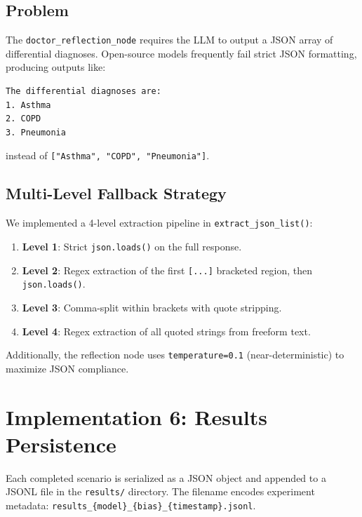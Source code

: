 \documentclass[12pt, a4paper]{article}
\begin{document}
\subsection{Problem}

The \texttt{doctor\_reflection\_node} requires the LLM to output a JSON array
of differential diagnoses. Open-source models frequently fail strict JSON
formatting, producing outputs like:

\begin{verbatim}
The differential diagnoses are:
1. Asthma
2. COPD
3. Pneumonia
\end{verbatim}

instead of \texttt{["Asthma", "COPD", "Pneumonia"]}.

\subsection{Multi-Level Fallback Strategy}

We implemented a 4-level extraction pipeline in \texttt{extract\_json\_list()}:

\begin{enumerate}
    \item \textbf{Level 1}: Strict \texttt{json.loads()} on the full response.
    \item \textbf{Level 2}: Regex extraction of the first \texttt{[...]}
    bracketed region, then \texttt{json.loads()}.
    \item \textbf{Level 3}: Comma-split within brackets with quote stripping.
    \item \textbf{Level 4}: Regex extraction of all quoted strings from
    freeform text.
\end{enumerate}

Additionally, the reflection node uses \texttt{temperature=0.1} (near-deterministic)
to maximize JSON compliance.

\section{Implementation 6: Results Persistence}
\label{sec:persistence}

Each completed scenario is serialized as a JSON object and appended to a
JSONL file in the \texttt{results/} directory. The filename encodes experiment
metadata: \texttt{results\_\{model\}\_\{bias\}\_\{timestamp\}.jsonl}.
\end{document}
